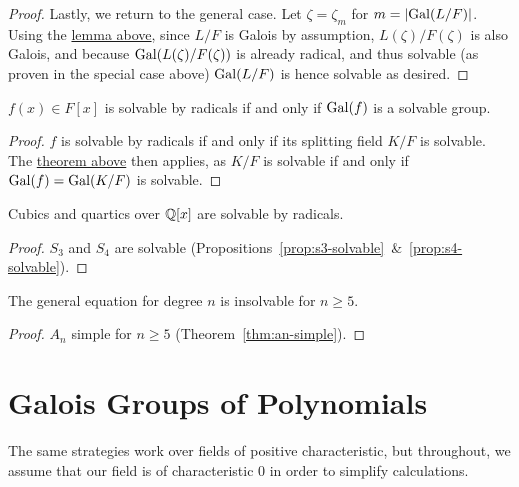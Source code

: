 \begin{proof}
    Lastly, we return to the general case.
    Let \(\zeta = \zeta_m\) for \(m = \abs{\operatorname{Gal}(L/F)}\).
    Using the \hyperref[lem:solvable-properties]{lemma above},
    since \(L/F\) is Galois by assumption, \(L(\zeta)/F(\zeta)\) is also Galois,
    and because \(\operatorname{Gal}(L(\zeta)/F(\zeta))\) is already radical,
    and thus solvable (as proven in the special case above)
    \(\operatorname{Gal}(L/F)\) is hence solvable as desired.
\end{proof}
\begin{corollary}
    \(f(x) \in F[x]\) is solvable by radicals if and only if \(\operatorname{Gal}(f)\) is a solvable group.
\end{corollary}
\begin{proof}
    \(f\) is solvable by radicals if and only if its splitting field \(K/F\) is solvable.
    The \hyperref[thm:solvable-galois]{theorem above} then applies,
    as \(K/F\) is solvable if and only if \(\operatorname{Gal}(f) = \operatorname{Gal}(K/F)\) is solvable.
\end{proof}
\begin{corollary}
    Cubics and quartics over \(\mathbb{Q}[x]\) are solvable by radicals.
\end{corollary}
\begin{proof}
    \(S_3\) and \(S_4\) are solvable (Propositions~\ref{prop:s3-solvable}~\&~\ref{prop:s4-solvable}).
\end{proof}
\begin{corollary}
    The general equation for degree \(n\) is insolvable for \(n \geq 5\).
\end{corollary}
\begin{proof}
    \(A_n\) simple for \(n \geq 5\) (Theorem~\ref{thm:an-simple}).
\end{proof}


\section{Galois Groups of Polynomials}

\begin{remark}
    The same strategies work over fields of positive characteristic,
    but throughout, we assume that our field is of characteristic 0 in order to simplify calculations.
\end{remark}

